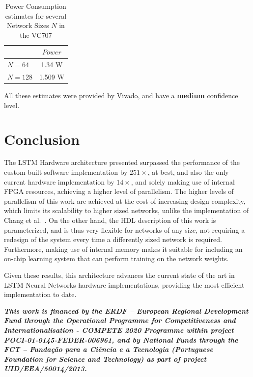 \documentclass{IEEEtran}
\begin{document}
\begin{table}
	\caption{Power Consumption estimates for several Network Sizes $N$ in the VC707}
	\label{tab:power-virtx7}
    \centering
  \begin{tabular}{ | l | c | }
    \hline
     & $Power$  \\
    \hline
    $N=64$ & 1.34 W \\
    \hline
    $N=128$ & 1.509 W\\
\hline
  \end{tabular}

\end{table}

All these estimates were provided by Vivado, and have a \textbf{medium} confidence level.

\section{Conclusion}\label{sec:concl}
The LSTM Hardware architecture presented surpassed the performance of the custom-built software implementation by $251\times$, at best,
and also the only current hardware implementation by $14\times$, and solely making use of internal FPGA
resources, achieving a higher level of parallelism. The higher levels of parallelism of this work are achieved at the cost of increasing
design complexity, which limits its scalability to higher sized networks, unlike the implementation of Chang et al.~\cite{Chang15}.
On the other hand, the HDL description of this work is parameterized, and is thus very flexible for networks of any size, not requiring
a redesign of the system every time a differently sized network is required. Furthermore, making use of internal memory makes it suitable
for including an on-chip learning system that can perform training on the network weights.

Given these results, this architecture advances the current state of the art in LSTM Neural Networks
hardware implementations, providing the most efficient implementation to date.

\smallskip
\emph{\textbf{This work is financed by the ERDF – European Regional Development Fund through the Operational Programme for Competitiveness and Internationalisation - COMPETE 2020 Programme within project \guillemotleft POCI-01-0145-FEDER-006961\guillemotright, and by National Funds through the FCT – Fundação para a Ciência e a Tecnologia (Portuguese Foundation for Science and Technology) as part of project \guillemotleft UID/EEA/50014/2013\guillemotright.}}



\end{document}
